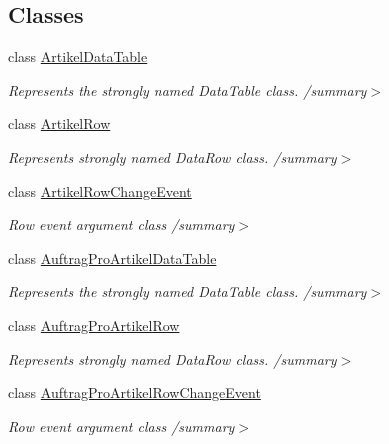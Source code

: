 \subsection*{Classes}
\begin{DoxyCompactItemize}
\item 
class \hyperlink{class_products_1_1_data_1_1ds_sage_1_1_artikel_data_table}{Artikel\+Data\+Table}
\begin{DoxyCompactList}\small\item\em Represents the strongly named Data\+Table class. /summary$>$ \end{DoxyCompactList}\item 
class \hyperlink{class_products_1_1_data_1_1ds_sage_1_1_artikel_row}{Artikel\+Row}
\begin{DoxyCompactList}\small\item\em Represents strongly named Data\+Row class. /summary$>$ \end{DoxyCompactList}\item 
class \hyperlink{class_products_1_1_data_1_1ds_sage_1_1_artikel_row_change_event}{Artikel\+Row\+Change\+Event}
\begin{DoxyCompactList}\small\item\em Row event argument class /summary$>$ \end{DoxyCompactList}\item 
class \hyperlink{class_products_1_1_data_1_1ds_sage_1_1_auftrag_pro_artikel_data_table}{Auftrag\+Pro\+Artikel\+Data\+Table}
\begin{DoxyCompactList}\small\item\em Represents the strongly named Data\+Table class. /summary$>$ \end{DoxyCompactList}\item 
class \hyperlink{class_products_1_1_data_1_1ds_sage_1_1_auftrag_pro_artikel_row}{Auftrag\+Pro\+Artikel\+Row}
\begin{DoxyCompactList}\small\item\em Represents strongly named Data\+Row class. /summary$>$ \end{DoxyCompactList}\item 
class \hyperlink{class_products_1_1_data_1_1ds_sage_1_1_auftrag_pro_artikel_row_change_event}{Auftrag\+Pro\+Artikel\+Row\+Change\+Event}
\begin{DoxyCompactList}\small\item\em Row event argument class /summary$>$ \end{DoxyCompactList}\item 

\end{DoxyCompactItemize}
